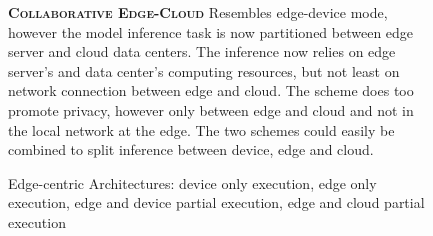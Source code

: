 \begin{figure}
\begin{minipage}{0.3\linewidth}
\begin{figure}
		\end{figure}
	\end{minipage}
	\begin{minipage}{0.5\linewidth}
		\centering
		\captionsetup[subfigure]{justification=centering}
		\begin{figure}
			\centering
		\end{figure}
	\end{minipage}
	\hfill
	\begin{minipage}{0.45\linewidth}
		\textbf{\protect{} \textsc{Collaborative Edge-Cloud}}
		\color{caption-color} \newline
		Resembles edge-device mode, however the model inference task is now partitioned between edge server and cloud data centers. The inference now relies on edge server's and data center's computing resources, but not least on network connection between edge and cloud. The scheme does too promote privacy, however only between edge and cloud and not in the local network at the edge. The two schemes could easily be combined to split inference between device, edge and cloud.
	\end{minipage}
	\caption[Edge-centric Architectures]{Edge-centric Architectures: \protect{} device only execution, \protect{} edge only execution,\protect{} edge and device partial execution, \protect{} edge and cloud partial execution}
	\label{fig:edge_arch}
\end{figure}

